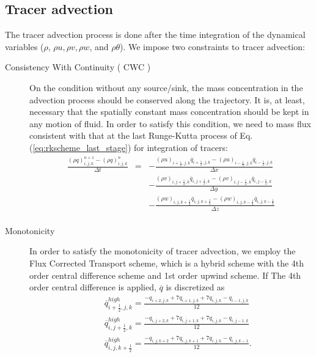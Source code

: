 \subsection{Tracer advection}
The tracer advection process is done after the time integration of
the dynamical variables ($\rho$, $\rho u,\rho v,\rho w$, and $\rho \theta$).
We impose two constraints to tracer advection:
\begin{description}
\item[Consistency With Continuity ( CWC )]
On the condition without any source/sink,
the mass concentration in the advection process
should be conserved along the trajectory.
It is, at least, necessary that
the spatially constant mass concentration should be kept
in any motion of fluid.
In order to satisfy this condition, we need to mass flux 
consistent with that at the last Runge-Kutta process of Eq.(\ref{eq:rkscheme_last_stage}) 
for integration of tracers:
\begin{eqnarray}
\frac{\left(\rho q\right)^{n+1}_{i,j,k} - \left(\rho q\right)^{n}_{i,j,k}}{\Delta t}
&=& - \frac{(\rho u)_{i+\frac{1}{2},j,k} \overline{q}_{i+\frac{1}{2},j,k}
           -(\rho u)_{i-\frac{1}{2},j,k} \overline{q}_{i-\frac{1}{2},j,k}}
     {\Delta x}\nonumber\\
& &  - \frac{(\rho v)_{i,j+\frac{1}{2},k} \overline{q}_{i,j+\frac{1}{2},k}
           -(\rho v)_{i,j-\frac{1}{2},k} \overline{q}_{i,j-\frac{1}{2},k}}
     {\Delta y}\nonumber\\
& &  - \frac{(\rho w)_{i,j,k+\frac{1}{2}} \overline{q}_{i,j,k+\frac{1}{2}}
           -(\rho w)_{i,j,k-\frac{1}{2}} \overline{q}_{i,j,k-\frac{1}{2}}}
     {\Delta z}\nonumber\\
\label{eq:tracer_int}
\end{eqnarray}
\item[Monotonicity]
In order to satisfy the monotonicity of tracer advection,
we employ the Flux Corrected Transport scheme, which is a hybrid scheme
with the 4th order central difference scheme and 1st order upwind scheme.
If The 4th order central difference is applied,
$\overline{q}$ is discretized as
\begin{eqnarray}
&& \overline{q}_{i+\frac{1}{2},j,k}^{high} =
\frac{-q_{i+2,j,k}+7q_{i+1,j,k}+7q_{i,j,k}-q_{i-1,j,k}}{12}\\
&& \overline{q}_{i,j+\frac{1}{2},k}^{high} =
\frac{-q_{i,j+2,k}+7q_{i,j+1,k}+7q_{i,j,k}-q_{i,j-1,k}}{12}\\
&& \overline{q}_{i,j,k+\frac{1}{2}}^{high} =
\frac{-q_{i,j,k+2}+7q_{i,j,k+1}+7q_{i,j,k}-q_{i,j,k-1}}{12}.

\end{eqnarray}
\end{description}
